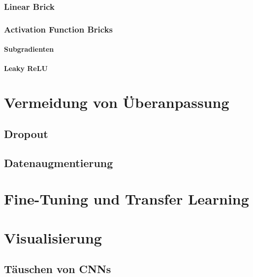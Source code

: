 			\subsubsection{Linear Brick} %

			\subsubsection{Activation Function Bricks} %

				\paragraph{Subgradienten} %

				\paragraph{Leaky ReLU} %

	\section{Vermeidung von Überanpassung} %

		\subsection{Dropout} %

		\subsection{Datenaugmentierung} %

	\section{Fine-Tuning und Transfer Learning} %

	\section{Visualisierung} %

		\subsection{Täuschen von CNNs} %

